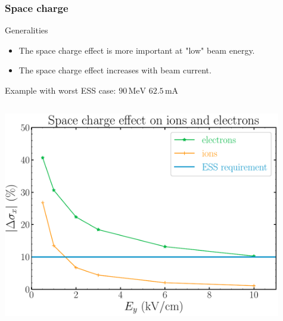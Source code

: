 \begin{frame}[t]
  \frametitle{Space charge}
  \begin{block}{Generalities}
    \begin{itemize}
      \item The space charge effect is more important at "low" beam energy.
      \item The space charge effect increases with beam current.
    \end{itemize}
  \end{block}
  Example with worst ESS case: $90\,\mathrm{MeV}$ $62.5\,\mathrm{mA}$
  \begin{columns}[T]
    \begin{column}{0.45\textwidth}
      \includegraphics[width=0.95\textwidth]{03_SIM/fig/fig000_SC_ions_electrons}
    \end{column}
    \begin{column}{0.45\textwidth}
      \begin{overlayarea}{\textwidth}{2cm}

\end{overlayarea}
\end{column}
\end{columns}
\end{frame}
